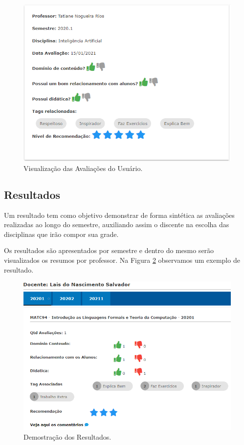 \documentclass[12pt, a4paper]{report}
\begin{document}
\begin{itemize}
\begin{figure}
\centering
\includegraphics[scale=0.7]{visualizacao_minha_avaliacao.png}
\caption{Visualização das Avaliações do Usuário.}
\label{fig:visualizacao_minha_avaliacao}
\end{figure}

\end{itemize}
\subsection{Resultados}
Um resultado tem como objetivo demonstrar de forma sintética as avaliações realizadas ao longo do semestre, auxiliando assim o discente na escolha das disciplinas que irão compor sua  grade.

Os resultados são apresentados por semestre e dentro do mesmo serão visualizados os resumos por professor. Na Figura \ref{fig:resultados} observamos um exemplo de resultado.

\begin{figure}
\centering
\includegraphics[scale=0.7]{resultados.png}
\caption{Demostração dos Resultados.}
\label{fig:resultados}
\end{figure}
\end{document}
